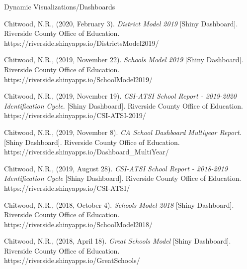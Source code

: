 \begin{cventries}
  \cventry
    {Dynamic Visualizations/Dashboards} %
    {} %
    {} %
    {} %
    {
      \begin{cvitems-apa} %
        \item {Chitwood, N.R., (2020, February 3). \textit{District Model 2019} [Shiny Dashboard]. Riverside County Office of Education. https://riverside.shinyapps.io/DistrictsModel2019/}
        \item {Chitwood, N.R., (2019, November 22). \textit{Schools Model 2019} [Shiny Dashboard]. Riverside County Office of Education. https://riverside.shinyapps.io/SchoolModel2019/}
        \item {Chitwood, N.R., (2019, November 19). \textit{CSI-ATSI School Report - 2019-2020 Identification Cycle}. [Shiny Dashboard]. Riverside County Office of Education. https://riverside.shinyapps.io/CSI-ATSI-2019/}
        \item {Chitwood, N.R., (2019, November 8). \textit{CA School Dashboard Multiyear Report}. [Shiny Dashboard]. Riverside County Office of Education. https://riverside.shinyapps.io/Dashboard\_MultiYear/}
        \item {Chitwood, N.R., (2019, August 28). \textit{CSI-ATSI School Report - 2018-2019 Identification Cycle} [Shiny Dashboard]. Riverside County Office of Education. https://riverside.shinyapps.io/CSI-ATSI/}
        \item {Chitwood, N.R., (2018, October 4). \textit{Schools Model 2018} [Shiny Dashboard]. Riverside County Office of Education. https://riverside.shinyapps.io/SchoolModel2018/}
        \item {Chitwood, N.R., (2018, April 18). \textit{Great Schools Model} [Shiny Dashboard]. Riverside County Office of Education. https://riverside.shinyapps.io/GreatSchools/}
      \end{cvitems-apa}
    }
\end{cventries}
